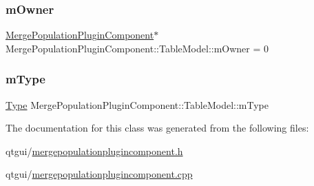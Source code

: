 \subsubsection{\texorpdfstring{mOwner}{mOwner}}
{\footnotesize\ttfamily \mbox{\hyperlink{class_merge_population_plugin_component}{Merge\+Population\+Plugin\+Component}}$\ast$ Merge\+Population\+Plugin\+Component\+::\+Table\+Model\+::m\+Owner = 0\hspace{0.3cm}{\ttfamily [protected]}}

\mbox{\label{class_merge_population_plugin_component_1_1_table_model_a4615c664a4c2130cca4ee14b30106a51}} 
\subsubsection{\texorpdfstring{mType}{mType}}
{\footnotesize\ttfamily \mbox{\hyperlink{class_merge_population_plugin_component_1_1_table_model_aedcae9b9dcacd928610323861dcb1258}{Type}} Merge\+Population\+Plugin\+Component\+::\+Table\+Model\+::m\+Type\hspace{0.3cm}{\ttfamily [protected]}}



The documentation for this class was generated from the following files\+:\begin{DoxyCompactItemize}
\item 
qtgui/\mbox{\hyperlink{mergepopulationplugincomponent_8h}{mergepopulationplugincomponent.\+h}}\item 
qtgui/\mbox{\hyperlink{mergepopulationplugincomponent_8cpp}{mergepopulationplugincomponent.\+cpp}}\end{DoxyCompactItemize}

